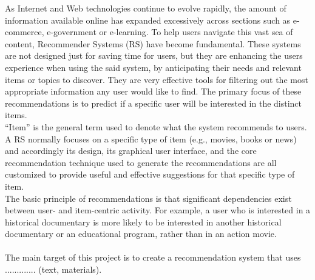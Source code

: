 \documentclass[\myFontSize,oneside,english,hidelinks,a4paper]{article}
\begin{document}
As Internet and Web technologies continue to evolve rapidly, the amount of information available online has expanded excessively across sections such as e-commerce, e-government or e-learning. To help users navigate this vast sea of content, Recommender Systems (RS) have become fundamental. These systems are not designed just for saving time for users, but they are enhancing the users experience when using the said system, by anticipating their needs and relevant items or topics to discover. They are very effective tools for filtering out the most appropriate information any user would like to find. The primary focus of these recommendations is to predict if a specific user will be interested in the distinct items.\\
%
“Item” is the general term used to denote what the system recommends to users. A RS normally focuses on a specific type of item (e.g., movies, books or news) and accordingly its design, its graphical user interface, and the core recommendation technique used to generate the recommendations are all customized to provide useful and effective suggestions for that specific type of item. \cite{pub.1036183961}\\
%
The basic principle of recommendations is that significant dependencies exist between user- and item-centric activity. 
For example, a user who is interested in a historical documentary is more likely to be interested in another historical documentary or an educational program, rather than in an action movie. \cite{pub.1022525812}\\\\
%
The main target of this project is to create a recommendation system that uses ............. (text, materials).\\\\\\





\clearpage{}
\end{document}
